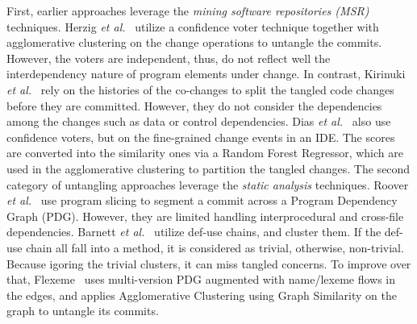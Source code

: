 First, earlier approaches leverage the {\em mining software
  repositories (MSR)} techniques. Herzig {\em et
  al.}~\cite{kim-msr13,kim-emse16} utilize a confidence voter
technique together with agglomerative clustering on the change
operations to untangle the commits.
However, the voters are independent, thus, do not reflect well the
interdependency nature of program elements under change. In contrast,
Kirinuki {\em et al.}~\cite{higo-apsec16, higo-icpc14} rely on the
histories of the co-changes to split the tangled code changes before
they are committed. However, they do not consider the dependencies
among the changes such as data or control dependencies. Dias {\em et
  al.}~\cite{dias-saner15} also use confidence voters, but on the
fine-grained change events in an IDE. The scores are converted into
the similarity ones via a Random Forest Regressor, which are used in
the agglomerative clustering to partition the tangled changes.  The
second category of untangling approaches leverage the {\em static
  analysis} techniques. Roover {\em et al.}~\cite{roover-scam18} use
program slicing to segment a commit across a Program Dependency Graph
(PDG).  However, they are limited handling interprocedural and
cross-file dependencies. Barnett {\em et al.}~\cite{barnett-icse15}
utilize def-use chains, and cluster them. If the def-use chain all
fall into a method, it is considered as trivial, otherwise,
non-trivial. Because igoring the trivial clusters, it can miss tangled
concerns. To improve over that, Flexeme~\cite{flexeme-fse20} uses
multi-version PDG augmented with name/lexeme flows in the edges, and
applies Agglomerative Clustering using Graph Similarity on the graph
to untangle its commits.

